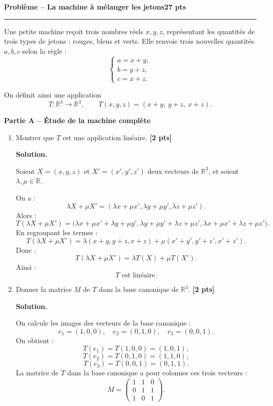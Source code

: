 \documentclass[11pt,a4paper]{article}
\newcommand{\pts}[1]{\hfill \textbf{[#1 pts]}}
\newcommand{\R}{\mathbb{R}}
\newcounter{probleme}
\newenvironment{probleme}[2]{
    \refstepcounter{probleme}
    \vspace{0.6cm}
    {\Large\color{bleu}\textbf{Problème \theprobleme{} -- #1}}\hfill \textbf{#2 pts}
    \par\medskip
    \hrule
    \medskip
}{\vspace{0.5cm}}
\newcommand{\partie}[1]{
    \vspace{0.35cm}
    {\large\color{gris}\textbf{#1}}
    \par\smallskip
}
\newcommand{\solution}{
    \textbf{\color{bleu}Solution. }
}
\begin{document}
\begin{probleme}{La machine à mélanger les jetons}{27}

Une petite machine reçoit trois nombres réels \(x,y,z\), représentant les quantités de trois types de jetons : rouges, bleus et verts. Elle renvoie trois nouvelles quantités \(a,b,c\) selon la règle :
\[
\begin{cases}
a=x+y,\\
b=y+z,\\
c=x+z.
\end{cases}
\]

On définit ainsi une application
\[
T:\R^3\longrightarrow \R^3,
\qquad
T(x,y,z)=(x+y,\ y+z,\ x+z).
\]

\partie{Partie A -- Étude de la machine complète}

\begin{enumerate}
    \item Montrer que \(T\) est une application linéaire. \pts{2}

    \solution

    Soient \(X=(x,y,z)\) et \(X'=(x',y',z')\) deux vecteurs de \(\R^3\), et soient \(\lambda,\mu\in\R\).

    On a :
    \[
    \lambda X+\mu X'
    =
    (\lambda x+\mu x',\lambda y+\mu y',\lambda z+\mu z').
    \]
    Alors :
    \[
    T(\lambda X+\mu X')
    =
    \big(
    \lambda x+\mu x'+\lambda y+\mu y',
    \lambda y+\mu y'+\lambda z+\mu z',
    \lambda x+\mu x'+\lambda z+\mu z'
    \big).
    \]
    En regroupant les termes :
    \[
    T(\lambda X+\mu X')
    =
    \lambda(x+y,y+z,x+z)
    +
    \mu(x'+y',y'+z',x'+z').
    \]
    Donc :
    \[
    T(\lambda X+\mu X')
    =
    \lambda T(X)+\mu T(X').
    \]
    Ainsi :
    \[
    \boxed{T\text{ est linéaire}.}
    \]

    \item Donner la matrice \(M\) de \(T\) dans la base canonique de \(\R^3\). \pts{2}

    \solution

    On calcule les images des vecteurs de la base canonique :
    \[
    e_1=(1,0,0),\quad e_2=(0,1,0),\quad e_3=(0,0,1).
    \]
    On obtient :
    \[
    T(e_1)=T(1,0,0)=(1,0,1),
    \]
    \[
    T(e_2)=T(0,1,0)=(1,1,0),
    \]
    \[
    T(e_3)=T(0,0,1)=(0,1,1).
    \]
    La matrice de \(T\) dans la base canonique a pour colonnes ces trois vecteurs :
    \[
    \boxed{
    M=
    \begin{pmatrix}
    1&1&0\\
    0&1&1\\
    1&0&1
    \end{pmatrix}.}
    \]


\end{enumerate}
\end{probleme}
\end{document}
